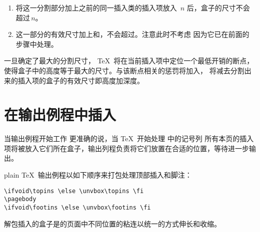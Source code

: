 \documentclass{book}
\begin{document}
\begin{enumerate}
\begin{enumerate}
\item 将这一分割部分加上之前的同一插入类的插入项放入 $\,n$ 后，盒子的尺寸不会超过$\,n$。


  \item 这一部分的有效尺寸加上和，不会超过。注意此时不考虑  因为它已在前面的步骤中处理。

  \end{enumerate}

  一旦确定了最大的分割尺寸， \TeX\  将在当前插入项中定位一个最低开销的断点，使得盒子中的高度等于最大的尺寸。与该断点相关的惩罚将加入， 将减去分割出来的插入项的盒子的有效尺寸即高度加深度。


\end{enumerate}



\section{在输出例程中插入}


当输出例程开始工作 \ldash 更准确的说，当 \TeX\ 开始处理  中的记号列  \rdash  所有本页的插入项将被放入它们所在盒子，输出列程负责将它们放置在合适的位置，等待进一步输出。


\begin{example}
plain \TeX\ 输出例程以如下顺序来打包处理顶部插入和脚注：

\begin{verbatim}
\ifvoid\topins \else \unvbox\topins \fi
\pagebody
\ifvoid\footins \else \unvbox\footins \fi
\end{verbatim}

解包插入的盒子是的页面中不同位置的粘连以统一的方式伸长和收缩。

\end{example}
\end{document}
